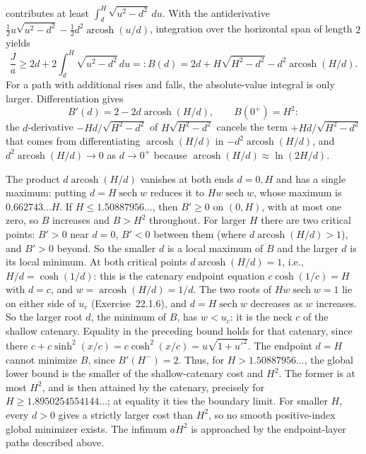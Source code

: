 contributes at least $\int_d^H\sqrt{u^2-d^2}\,du$. With the
antiderivative
$\tfrac12u\sqrt{u^2-d^2}-\tfrac12d^2\operatorname{arcosh}(u/d)$,
integration over the horizontal span of length $2$ yields
\[
 \frac Ja\ge 2d+2\int_d^H\sqrt{u^2-d^2}\,du
 =:B(d)
 =2d+H\sqrt{H^2-d^2}-d^2\operatorname{arcosh}(H/d).
\]
For a path with additional rises and falls, the absolute-value
integral is only larger. Differentiation gives
\[
 B'(d)=2-2d\operatorname{arcosh}(H/d),\qquad B(0^+)=H^2:
\]
the $d$-derivative $-Hd/\sqrt{H^2-d^2}$ of $H\sqrt{H^2-d^2}$ cancels
the term $+Hd/\sqrt{H^2-d^2}$ that comes from differentiating
$\operatorname{arcosh}(H/d)$ in $-d^2\operatorname{arcosh}(H/d)$, and
$d^2\operatorname{arcosh}(H/d)\to0$ as $d\to0^+$ because
$\operatorname{arcosh}(H/d)\approx\ln(2H/d)$.

The product $d\operatorname{arcosh}(H/d)$ vanishes at both ends
$d=0,H$ and has a single maximum: putting
$d=H\operatorname{sech}w$ reduces it to $Hw\operatorname{sech}w$,
whose maximum is $0.662743\ldots H$. If $H\le1.50887956\ldots$, then
$B'\ge0$ on $(0,H)$, with at most one zero, so $B$ increases and
$B>H^2$ throughout. For larger $H$ there are two critical points:
$B'>0$ near $d=0$, $B'<0$ between them (where
$d\operatorname{arcosh}(H/d)>1$), and $B'>0$ beyond. So the smaller $d$
is a local maximum of $B$ and the larger $d$ is its local minimum. At
both critical points $d\operatorname{arcosh}(H/d)=1$, i.e.,
$H/d=\cosh(1/d)$: this is the catenary endpoint equation
$c\cosh(1/c)=H$ with $d=c$, and $w=\operatorname{arcosh}(H/d)=1/d$.
The two roots of $Hw\operatorname{sech}w=1$ lie on either side of $u_c$
(Exercise~22.1.6), and $d=H\operatorname{sech}w$ decreases as $w$
increases. So the larger root $d$, the minimum of $B$, has $w<u_c$: it
is the neck $c$ of the shallow catenary. Equality in the preceding bound
holds for that catenary, since there
$c+c\sinh^2(x/c)=c\cosh^2(x/c)=u\sqrt{1+u'^2}$. The endpoint $d=H$
cannot minimize $B$, since $B'(H^-)=2$. Thus, for
$H>1.50887956\ldots$, the global lower bound is
the smaller of the shallow-catenary cost and $H^2$. The former is at
most $H^2$, and is then attained by the catenary, precisely for
$H\ge1.8950254554144\ldots$; at equality it ties the boundary limit.
For smaller $H$, every $d>0$ gives a strictly larger cost than $H^2$,
so no smooth positive-index global minimizer exists. The infimum
$aH^2$ is approached by the endpoint-layer paths described above.



